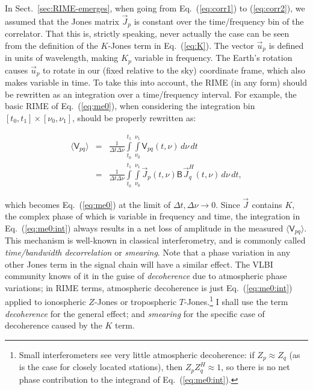 \documentclass{aa}
\newcommand{\herm}{H}
\newcommand{\jones}[2]{\vec {#1}_{#2}}
\newcommand{\jonesT}[2]{\vec {#1}^{\herm}_{#2}}
\newcommand{\coh}[2]{\mathsf{{#1}}_{{#2}}}
\begin{document}
In Sect.~\ref{sec:RIME-emerges}, when going from Eq.~(\ref{eq:corr1}) to (\ref{eq:corr2}), we assumed that the Jones matrix $\jones{J}{p}$ is constant over the time/frequency bin of the correlator. That this is, strictly speaking, never actually the case can be seen from the definition of the $K$-Jones term in Eq.~(\ref{eq:K}). The vector $\vec u_p$ is defined in units of wavelength, making $K_p$ variable in frequency. The Earth's rotation causes $\vec u_p$ to rotate in our (fixed relative to the sky) coordinate frame, which also makes variable in time. To take this into account, the RIME (in any form) should be rewritten as an integration over a time/frequency interval. For example, the basic RIME of Eq.~(\ref{eq:me0}), when considering the integration bin $[t_0,t_1]\times[\nu_0,\nu_1]$, should be properly rewritten as:

\begin{eqnarray}
\langle \coh{V}{pq} \rangle & = & \frac{1}{\Delta t\Delta\nu}\int\limits^{t_1}_{t_0} \int\limits^{\nu_1}_{\nu_0} \coh{V}{pq}(t,\nu)\,d\nu\,dt \nonumber \\
\label{eq:me0:int}
& = & \frac{1}{\Delta t\Delta\nu}\int\limits^{t_1}_{t_0} \int\limits^{\nu_1}_{\nu_0} \jones{J}{p} (t,\nu) \coh{B}{}  \jonesT{J}{q}(t,\nu) \, d\nu\,dt,
\end{eqnarray}

which becomes Eq.~(\ref{eq:me0}) at the limit of $\Delta t,\Delta\nu \to 0$. Since $\jones{J}{}$ contains $K$, the complex phase of which is variable in frequency and time, the integration in Eq.~(\ref{eq:me0:int}) always results in a net loss of amplitude in the measured $\langle \coh{V}{pq} \rangle $. This mechanism is well-known in classical interferometry, and is commonly called {\em time/bandwidth decorrelation} or {\em smearing}. Note that a phase variation in any other Jones term in the signal chain will have a similar effect. The VLBI community knows of it in the guise of {\em decoherence} due to atmospheric phase variations; in RIME terms, atmospheric decoherence is just Eq.~(\ref{eq:me0:int}) applied to ionospheric $Z$-Jones or tropospheric $T$-Jones.\footnote{Small interferometers see very little atmospheric decoherence: if $Z_p\approx Z_q$ (as is the case for closely located stations), then $Z_p Z^\herm_q \approx 1$, so there is no net phase contribution to the integrand of Eq.~(\ref{eq:me0:int}).} I shall use the term {\em decoherence} for the general effect; and {\em smearing} for the specific case of decoherence caused by the $K$ term.
\end{document}
